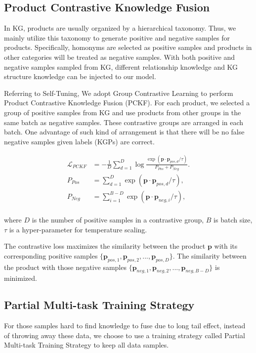 \subsection{Product Contrastive Knowledge Fusion}
In KG, products are usually organized by a hierarchical taxonomy. Thus, we mainly utilize this taxonomy to generate positive and negative samples for products. Specifically, homonyms are selected as positive samples and products in other categories will be treated as negative samples. With both positive and negative samples sampled from KG, different relationship knowledge and KG structure knowledge can be injected to our model.

Referring to Self-Tuning\cite{wang21}, We adopt Group Contrastive Learning to perform Product Contrastive Knowledge Fusion (PCKF). For each product, we selected a group of positive samples from KG and use products from other groups in the same batch as negative samples. These contrastive groups are arranged in each batch. One advantage of such kind of arrangement  is that there will be no false negative samples given labels (KGPs) are correct.

\begin{equation}
    \begin{aligned}
    \mathcal{L}_{PCKF}&=-\frac{1}{D}\sum_{d=1}^{D}{\log\frac{\exp(\mathbf{p}\cdot\mathbf{p}_{pos,d}/\tau)}{P_{Pos}+P_{Neg}}}. \\
    P_{Pos}&=\sum_{d=1}^{D}{\exp(\mathbf{p}\cdot\mathbf{p}_{pos, d}/\tau)}, \\
    P_{Neg}&=\sum_{i=1}^{B-D}
    {\exp(\mathbf{p}\cdot\mathbf{p}_{neg,i}/\tau)},\\
    \end{aligned}
\end{equation}

\noindent where $D$ is the number of positive samples in a contrastive group, $B$ is batch size, $\tau$ is a hyper-parameter for temperature scaling.

The contrastive loss maximizes the similarity between the product $\mathbf{p}$ with its corresponding positive samples $\{\mathbf{p}_{pos,1}, \mathbf{p}_{pos,2}, ..., \mathbf{p}_{pos,D}\}$. The similarity between the product with those negative samples $\{\mathbf{p}_{neg, 1}, \mathbf{p}_{neg, 2}, ..., \mathbf{p}_{neg, B-D}\}$ is minimized.

\subsection{Partial Multi-task Training Strategy}
For those samples hard to find knowledge to fuse due to long tail effect, instead of throwing away these data, we choose to use a training strategy called Partial Multi-task Training Strategy to keep all data samples. 

